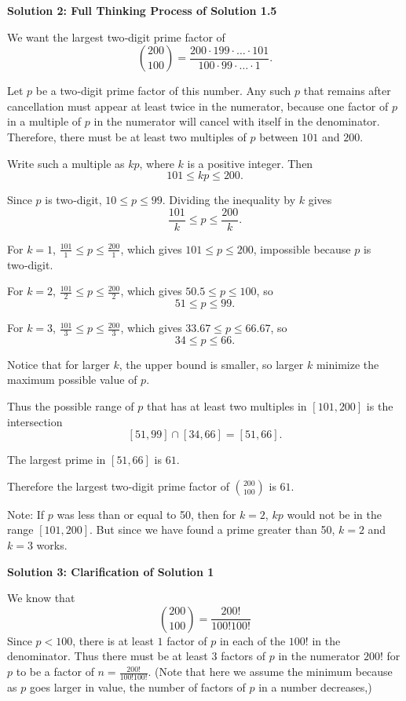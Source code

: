 \begin{enumerate}
\textbf{Solution 2: Full Thinking Process of Solution 1.5}

We want the largest two‑digit prime factor of
 \[{200\choose100}=\frac{200\cdot199\cdot\ldots\cdot101}{100\cdot99\cdot\ldots\cdot1}.\]

 Let $p$ be a two‑digit prime factor of this number. Any such $p$ that remains after cancellation must appear at least twice in the numerator, because one factor of $p$ in a multiple of $p$ in the numerator will cancel with itself in the denominator. Therefore, there must be at least two multiples of $p$ between $101$ and $200$.

 Write such a multiple as $kp$, where $k$ is a positive integer. Then
 \[101\le kp\le200.\]

 Since $p$ is two‑digit, $10\le p\le99$. Dividing the inequality by $k$ gives
 \[\frac{101}{k}\le p\le\frac{200}{k}.\]

 For $k=1$, $\frac{101}{1}\le p\le\frac{200}{1}$, which gives $101\le p\le200$, impossible because $p$ is two‑digit.

 For $k=2$, $\frac{101}{2}\le p\le\frac{200}{2}$, which gives $50.5\le p\le100$, so
 \[51\le p\le99.\]

 For $k=3$, $\frac{101}{3}\le p\le\frac{200}{3}$, which gives $33.67\le p\le66.67$, so
 \[34\le p\le66.\]

 Notice that for larger $k$, the upper bound is smaller, so larger $k$ minimize the maximum possible value of $p$.

 Thus the possible range of $p$ that has at least two multiples in $[101,200]$ is the intersection
 \[[51,99]\cap[34,66]=[51,66].\]

 The largest prime in $[51,66]$ is $61$.

 Therefore the largest two‑digit prime factor of ${200\choose100}$ is $\boxed{61}$.

 Note: If $p$ was less than or equal to 50, then for $k=2$, $kp$ would not be in the range $[101,200]$. But since we have found a prime greater than 50, $k=2$ and $k=3$ works.

 



\textbf{Solution 3: Clarification of Solution 1}

We know that 
 \[{200\choose100}=\frac{200!}{100!100!}\]Since $p<100$, there is at least $1$ factor of $p$ in each of the $100!$ in the denominator. Thus there must be at least $3$ factors of $p$ in the numerator $200!$ for $p$ to be a factor of $n=\frac{200!}{100!100!}$. (Note that here we assume the minimum because as $p$ goes larger in value, the number of factors of $p$ in a number decreases,)


\end{enumerate}
